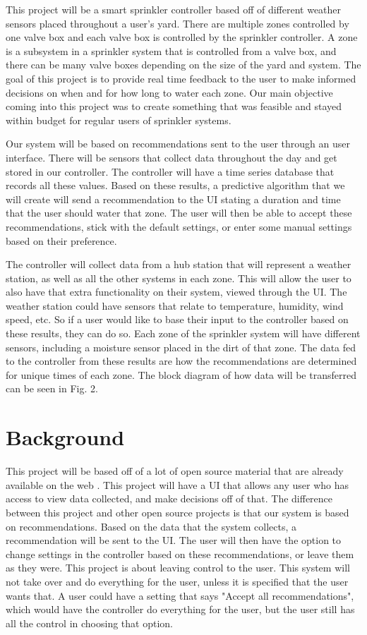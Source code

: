 \documentclass[letterpaper, 10 pt, conference]{ieeeconf}  %
\begin{document}
This project will be a smart sprinkler controller based off of different weather sensors placed throughout a user's yard. There are multiple zones controlled by one valve box and each valve box is controlled by the sprinkler controller. A zone is a subsystem in a sprinkler system that is controlled from a valve box, and there can be many valve boxes depending on the size of the yard and system. The goal of this project is to provide real time feedback to the user to make informed decisions on when and for how long to water each zone. Our main objective coming into this project was to create something that was feasible and stayed within budget for regular users of sprinkler systems.

Our system will be based on recommendations sent to the user through an user interface. There will be sensors that collect data throughout the day and get stored in our controller. The controller will have a time series database that records all these values. Based on these results, a predictive algorithm that we will create will send a recommendation to the UI stating a duration and time that the user should water that zone. The user will then be able to accept these recommendations, stick with the default settings, or enter some manual settings based on their preference. 

The controller will collect data from a hub station that will represent a weather station, as well as all the other systems in each zone. This will allow the user to also have that extra functionality on their system, viewed through the UI. The weather station could have sensors that relate to temperature, humidity, wind speed, etc. So if a user would like to base their input to the controller based on these results, they can do so. Each zone of the sprinkler system will have different sensors, including a moisture sensor placed in the dirt of that zone. The data fed to the controller from these results are how the recommendations are determined for unique times of each zone. The block diagram of how data will be transferred can be seen in Fig. 2.

\section{Background}
This project will be based off of a lot of open source material that are already available on the web \cite{SIP}. This project will have a UI that allows any user who has access to view data collected, and make decisions off of that. The difference between this project and other open source projects is that our system is based on recommendations. Based on the data that the system collects, a recommendation will be sent to the UI. The user will then have the option to change settings in the controller based on these recommendations, or leave them as they were. This project is about leaving control to the user. This system will not take over and do everything for the user, unless it is specified that the user wants that. A user could have a setting that says "Accept all recommendations", which would have the controller do everything for the user, but the user still has all the control in choosing that option. 
\end{document}

